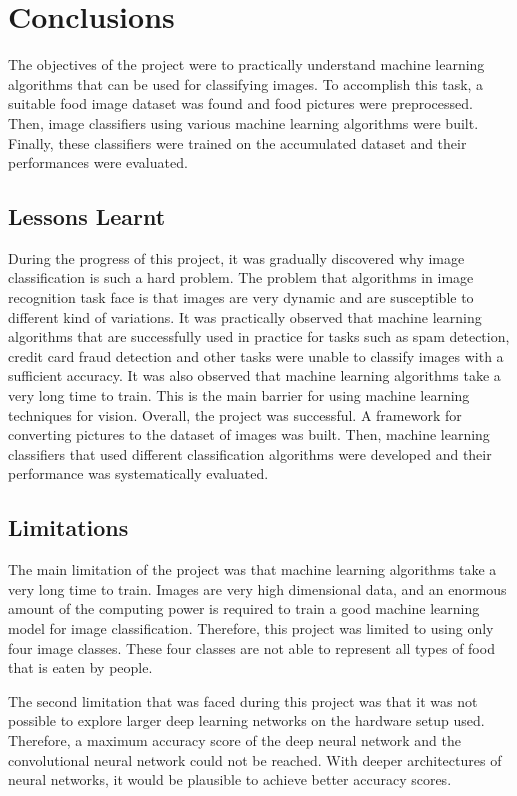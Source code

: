 \chapter{Conclusions}



The objectives of the project were to practically understand machine learning algorithms that can be used for classifying images. To accomplish this task,  a suitable food image dataset was found and food pictures were preprocessed. Then, image classifiers using various machine learning algorithms were built.  Finally, these classifiers were trained on the accumulated dataset and their performances were evaluated.

\section{Lessons Learnt}

During the progress of this project, it was gradually discovered why image classification is such a hard problem.  The problem that algorithms in image recognition task face is that images are very dynamic and are susceptible to different kind of variations. It was practically observed that machine learning algorithms that are successfully used in practice for tasks such as spam detection, credit card fraud detection and other tasks were unable to classify images with a sufficient accuracy.  It was also observed that machine learning algorithms take a very long time to train. This is the main barrier for using machine learning techniques for vision. Overall, the project was successful. A framework for converting pictures to the dataset of images was built. Then,  machine learning classifiers that used different classification algorithms were developed and their performance was systematically evaluated.

\section{Limitations}
The main limitation of the project was that machine learning algorithms take a very long time to train. Images are very high dimensional data, and an enormous amount of the computing power is required to train a good machine learning model for image classification. Therefore, this project was limited to using only four image classes. These four classes are not able to represent all types of food that is eaten by people.

The second limitation that was faced during this project was that it was not possible to explore larger deep learning networks on the hardware setup used. Therefore, a maximum accuracy score of the deep neural network and the convolutional neural network could not be reached. With deeper architectures of neural networks, it would be plausible to achieve better accuracy scores.


